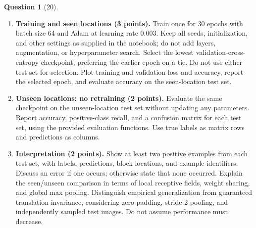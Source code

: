 \documentclass[12pt]{article}
\theoremstyle{definition}
\newtheorem{exercise}{Question}
\begin{document}
\begin{exercise}[20]
{\begin{enumerate}[label=\textbf{2.2.\arabic*}, leftmargin=*]
\item \textbf{Training and seen locations (3 points).}
Train once for 30 epochs with batch size 64 and Adam at learning
rate $0.003$. Keep all seeds, initialization, and other settings
as supplied in the notebook; do not add layers, augmentation,
or hyperparameter search.
Select the lowest validation-cross-entropy checkpoint, preferring
the earlier epoch on a tie. Do not use either test set for selection.
Plot training and validation loss and accuracy, report the selected
epoch, and evaluate accuracy on the seen-location test set.

\item \textbf{Unseen locations: no retraining (2 points).}
Evaluate the same checkpoint on the unseen-location test set
without updating any parameters. Report accuracy, positive-class
recall, and a confusion matrix for each test set, using the
provided evaluation functions. Use true labels as matrix rows
and predictions as columns.

\item \textbf{Interpretation (2 points).}
Show at least two positive examples from each test set, with
labels, predictions, block locations, and example identifiers.
Discuss an error if one occurs; otherwise state that none occurred.
Explain the seen/unseen comparison in terms of local receptive
fields, weight sharing, and global max pooling. Distinguish
empirical generalization from guaranteed translation invariance,
considering zero-padding, stride-2 pooling, and independently
sampled test images. Do not assume performance must decrease.

\end{enumerate}
}
\end{exercise}
\end{document}
